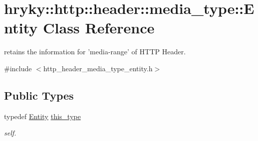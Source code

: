 \hypertarget{classhryky_1_1http_1_1header_1_1media__type_1_1_entity}{\section{hryky\-:\-:http\-:\-:header\-:\-:media\-\_\-type\-:\-:Entity Class Reference}
\label{classhryky_1_1http_1_1header_1_1media__type_1_1_entity}
}


retains the information for 'media-\/range' of H\-T\-T\-P Header.  




{\ttfamily \#include $<$http\-\_\-header\-\_\-media\-\_\-type\-\_\-entity.\-h$>$}

\subsection*{Public Types}
\begin{DoxyCompactItemize}
\item 
\hypertarget{classhryky_1_1http_1_1header_1_1media__type_1_1_entity_ac2b17061949e39ad285a8517833ec4f4}{typedef \hyperlink{classhryky_1_1http_1_1header_1_1media__type_1_1_entity}{Entity} \hyperlink{classhryky_1_1http_1_1header_1_1media__type_1_1_entity_ac2b17061949e39ad285a8517833ec4f4}{this\-\_\-type}}\label{classhryky_1_1http_1_1header_1_1media__type_1_1_entity_ac2b17061949e39ad285a8517833ec4f4}

\begin{DoxyCompactList}\small\item\em self. \end{DoxyCompactList}\end{DoxyCompactItemize}

